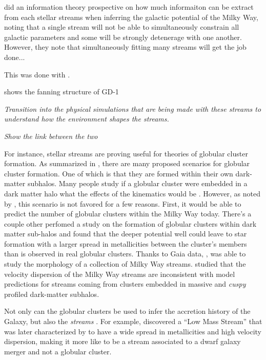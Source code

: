     \citet{2018ApJ...867..101B} did an information theory prospective on how much informaiton can be extract from each stellar streams when inferring the galactic potential of the Milky Way, noting that a single stream will not be able to simultaneously constrain all galactic parameters and some will be strongly detenerage with one another. However, they note that simultaneously fitting many streams will get the job done...

    This was done with \citet{2024ApJ...967...89I}. 


    \citet{2018MNRAS.478.3862M} shows the fanning structure of GD-1
 


    \textit{Transition into the physical simulations that are being made with these streams to understand how the environment shapes the streams.}

    \textit{Show the link between the two}

    For instance, stellar streams are proving useful for theories of globular cluster formation. As summarized in \citet{2025arXiv250116438K}, there are many proposed scenarios for globular cluster formation. One of which is that they are formed within their own dark-matter subhalos. Many people study if a globular cluster were embedded in a dark matter halo what the effects of the kinematics would be \citep{2022A&A...667A.112V}. However, as noted by \citet{2025arXiv250116438K}, this scenario is not favored for a few reasons. First, it would be able to predict the number of globular clusters within the Milky Way today. There's a couple other \citet{2016ApJ...823...52K} perfomed a study on the formation of globular clusters within dark matter sub-halos and found that the deeper potential well could leave to star formation with a larger spread in metallicities between the cluster's members than is observed in real globular clusters. Thanks to Gaia data, \citet{2022ApJ...941L..38M}, was able to study the morphology of a collection of Milky Way streams. \citet{2022ApJ...941L..38M} studied that the velocity dispersion of the Milky Way streams are inconsistent with model predictions for streams coming from clusters embedded in massive and \textit{cuspy} profiled dark-matter subhalos.

    Not only can the globular clusters be used to infer the accretion history of the Galaxy, but also the \textit{streams} \citep{2021ApJ...909L..26B}. For example, \citet{2020ApJ...898L..37Y} discovered a ``Low Mass Stream'' that was later characterized by \citet{2021ApJ...920...51M} to have a wide spread in metallicities and high velocity dispersion, making it more like to be a stream associated to a dwarf galaxy merger and not a globular cluster. 


